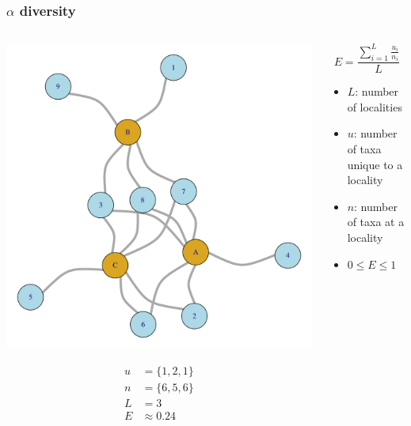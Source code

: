 \documentclass{beamer}
\begin{document}
\begin{frame}
  \frametitle{\(\alpha\) diversity}

  \begin{columns}
    \begin{column}{0.6\textwidth}
      \begin{center}
        \includegraphics[height = 0.5\textheight, width = \textwidth, keepaspectratio = true]{figure/sim_graph}

        \begin{align*}
          u &= \{1, 2, 1\}\\
          n &= \{6, 5, 6\}\\
          L &= 3\\
          E &\approx 0.24
        \end{align*}
      \end{center}
    \end{column}
    \begin{column}{0.4\textwidth}
      \[
        E = \frac{\sum_{i = 1}^{L} \frac{u_{i}}{n_{i}}}{L}
      \]

      \begin{itemize}
        \item \(L\): number of localities
        \item \(u\): number of taxa unique to a locality
        \item \(n\): number of taxa at a locality
        \item \(0 \leq E \leq 1\)
      \end{itemize}
    \end{column}
  \end{columns}
\end{frame}
\end{document}
